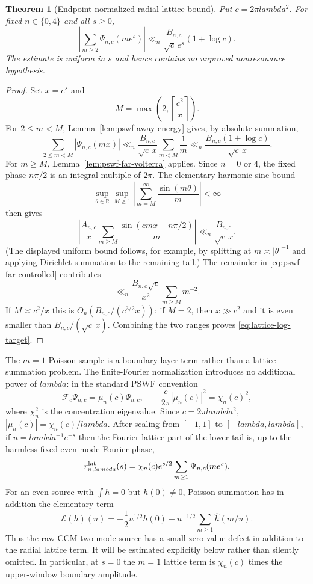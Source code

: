 \documentclass[11pt]{article}
\def\lambda{lambda}%
\newtheorem{theorem}{Theorem}[section]
\theoremstyle{remark}
\begin{document}
\begin{theorem}[Endpoint-normalized radial lattice bound]\label{thm:lattice-tail}
Put $c=2\pi\lambda^2$.  For fixed $n\in\{0,4\}$ and all $s\ge0$,
\begin{equation}\label{eq:lattice-log-target}
 \boxed{
 \left|\sum_{m\ge2}\Psi_{n,c}(me^s)\right|
 \ll_n
 \frac{B_{n,c}}{\sqrt c\,e^s}(1+\log c).}
\end{equation}
The estimate is uniform in $s$ and hence contains no unproved nonresonance hypothesis.
\end{theorem}
\begin{proof}
Set $x=e^s$ and
\[
 M=\max\!\left(2,\left\lceil\frac{c^2}{x}\right\rceil\right).
\]
For $2\le m<M$, Lemma~\ref{lem:pswf-away-energy} gives, by absolute summation,
\[
 \sum_{2\le m<M}|\Psi_{n,c}(mx)|
 \ll_n\frac{B_{n,c}}{\sqrt c\,x}\sum_{m<M}\frac1m
 \ll_n\frac{B_{n,c}(1+\log c)}{\sqrt c\,x}.
\]
For $m\ge M$, Lemma~\ref{lem:pswf-far-volterra} applies.  Since $n=0$ or $4$, the fixed phase $n\pi/2$ is an integral multiple of $2\pi$.  The elementary harmonic-sine bound
\[
 \sup_{\theta\in\mathbb R}\sup_{M\ge1}
 \left|\sum_{m=M}^{\infty}\frac{\sin(m\theta)}m\right|<\infty
\]
then gives
\[
 \left|\frac{A_{n,c}}x\sum_{m\ge M}\frac{\sin(cmx-n\pi/2)}m\right|
 \ll_n\frac{B_{n,c}}{\sqrt c\,x}.
\]
(The displayed uniform bound follows, for example, by splitting at $m\asymp |\theta|^{-1}$ and applying Dirichlet summation to the remaining tail.)
The remainder in \eqref{eq:pswf-far-controlled} contributes
\[
 \ll_n\frac{B_{n,c}\sqrt c}{x^2}\sum_{m\ge M}m^{-2}.
\]
If $M\asymp c^2/x$ this is $O_n(B_{n,c}/(c^{3/2}x))$; if $M=2$, then $x\gg c^2$ and it is even smaller than $B_{n,c}/(\sqrt c\,x)$.  Combining the two ranges proves \eqref{eq:lattice-log-target}.
\end{proof}

The $m=1$ Poisson sample is a boundary-layer term rather than a lattice-summation problem.  The finite-Fourier normalization introduces no additional power of $\lambda$: in the standard PSWF convention
\[
 \mathcal F_c\Psi_{n,c}=\mu_n(c)\Psi_{n,c},\qquad
 \frac{c}{2\pi}|\mu_n(c)|^2=\chi_n(c)^2,
\]
where $\chi_n^2$ is the concentration eigenvalue.  Since $c=2\pi\lambda^2$,
$|\mu_n(c)|=\chi_n(c)/\lambda$.  After scaling from $[-1,1]$ to
$[-\lambda,\lambda]$, if $u=\lambda^{-1}e^{-s}$ then the Fourier-lattice part of the lower tail is, up to the harmless fixed even-mode Fourier phase,
\begin{equation}\label{eq:scaled-poisson-radial}
 r_{n,\lambda}^{\rm lat}(s)
 =\chi_n(c)e^{s/2}\sum_{m\ge1}\Psi_{n,c}(me^s).
\end{equation}
For an even source with $\int h=0$ but $h(0)\ne0$, Poisson summation has in addition the elementary term
\begin{equation}\label{eq:poisson-zero-defect}
 \mathcal E(h)(u)
 =-\frac12u^{1/2}h(0)
   +u^{-1/2}\sum_{m\ge1}\widehat h(m/u).
\end{equation}
Thus the raw CCM two-mode source has a small zero-value defect in addition to the radial lattice term.  It will be estimated explicitly below rather than silently omitted.  In particular, at $s=0$ the $m=1$ lattice term is $\chi_n(c)$ times the upper-window boundary amplitude.
\end{document}
